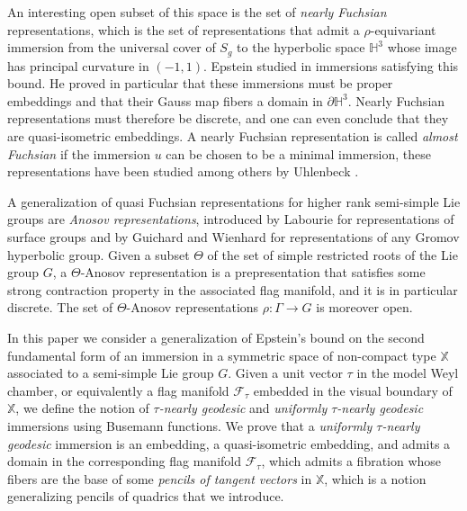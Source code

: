 \documentclass[reqno,10pt]{amsart}
\theoremstyle{plain}
\theoremstyle{definition}
\theoremstyle{remark}
\newcommand{\type}{\tau}
\newcommand{\X}{\mathbb{X}}
\begin{document}
\medskip

An interesting open subset of this space is the set of \emph{nearly Fuchsian} representations, which is the set of representations that admit a $\rho$-equivariant immersion from the universal cover of $S_g$ to the hyperbolic space $\mathbb{H}^3$ whose image has principal curvature in $(-1,1)$. Epstein studied in \cite{Epstein} immersions satisfying this bound. He proved in particular that these immersions must be proper embeddings and that their Gauss map fibers a domain in $\partial \mathbb{H}^3$.
 Nearly Fuchsian representations must therefore be discrete, and one can even conclude that they are quasi-isometric embeddings. A nearly Fuchsian representation is called \emph{almost Fuchsian} if the immersion $u$ can be chosen to be a minimal immersion, these representations have been studied among others by Uhlenbeck \cite{Uhlenbeck}.
 
 \medskip
 
A generalization of quasi Fuchsian representations for higher rank semi-simple Lie groups are \emph{Anosov representations}, introduced by Labourie \cite{Labourie} for representations of surface groups and by Guichard and Wienhard \cite{GWDod} for representations of any Gromov hyperbolic group. Given a subset $\Theta$ of the set of simple restricted roots of the Lie group $G$, a $\Theta$-Anosov representation is a prepresentation that satisfies some strong contraction property in the associated flag manifold, and it is in particular discrete. The set of $\Theta$-Anosov representations $\rho:\Gamma\to G$ is moreover open.

\medskip

In this paper we consider a generalization of Epstein's bound on the second fundamental form of an immersion in a symmetric space of non-compact type $\X$ associated to a semi-simple Lie group $G$. Given a unit vector $\type$ in the model Weyl chamber, or equivalently a flag manifold $\mathcal{F}_\type$ embedded in the visual boundary of $\X$, we define the notion of \emph{$\type$-nearly geodesic} and  \emph{uniformly $\type$-nearly geodesic} immersions using Busemann functions.
We prove that a \emph{uniformly $\type$-nearly geodesic} immersion is an embedding, a quasi-isometric embedding, and admits a domain in the corresponding flag manifold $\mathcal{F}_\type$, which admits a fibration whose fibers are the base of some \emph{pencils of tangent vectors} in $\X$, which is a notion generalizing pencils of quadrics that we introduce.

\medskip
\end{document}
